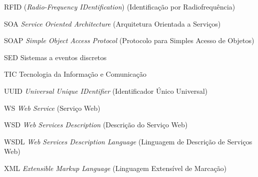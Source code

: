 \begin{siglas}
	\item[RFID] (\textit{Radio-Frequency IDentification}) (Identificação por Radiofrequência)
	\item[SOA] \textit{Service Oriented Architecture} (Arquitetura Orientada a Serviços)
	\item[SOAP] \textit{Simple Object Access Protocol} (Protocolo para Simples Acesso de Objetos)
	\item[SED] Sistemas a eventos discretos
	\item[TIC] Tecnologia da Informação e Comunicação
	\item[UUID] \textit{Universal Unique IDentifier} (Identificador Único Universal)
	\item[WS] \textit{Web Service} (Serviço Web)
	\item[WSD] \textit{Web Services Description} (Descrição do Serviço Web)
	\item[WSDL] \textit{Web Services Description Language} (Linguagem de Descrição de Serviços Web)
	\item[XML] \textit{Extensible Markup Language} (Linguagem Extensível de Marcação)
\end{siglas}

\tableofcontents*
\cleardoublepage
